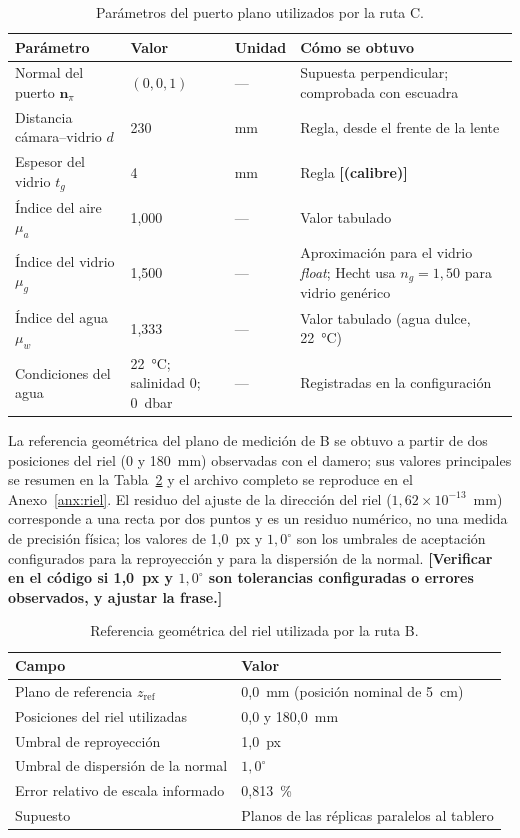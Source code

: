 \documentclass{report}
\newcommand{\pend}[1]{\textbf{[#1]}}
\newcommand{\si}[1]{#1}
\newcommand{\celsius}{°C}
\begin{document}
\begin{table}[htbp]

\caption{Parámetros del puerto plano utilizados por la ruta C.}
\label{tab:puerto}
\begin{tabular}{@{}p{3.6cm}p{2.6cm}p{1.2cm}p{5.4cm}@{}}
\hline
Parámetro & Valor & Unidad & Cómo se obtuvo \\
\hline
Normal del puerto $\mathbf{n}_\pi$ & $(0, 0, 1)$ & --- & Supuesta perpendicular; comprobada con escuadra \\
Distancia cámara--vidrio $d$ & 230 & mm & Regla, desde el frente de la lente \\
Espesor del vidrio $t_g$ & 4 & mm & Regla \pend{(calibre)} \\
Índice del aire $\mu_a$ & 1,000 & --- & Valor tabulado \\
Índice del vidrio $\mu_g$ & 1,500 & --- & Aproximación para el vidrio \emph{float}; Hecht usa $n_g = 1{,}50$ para vidrio genérico \parencite[pp.~111, 132]{Hecht2017} \\
Índice del agua $\mu_w$ & 1,333 & --- & Valor tabulado (agua dulce, 22~\si{\celsius}) \\
Condiciones del agua & 22~\si{\celsius}; salinidad 0; 0~dbar & --- & Registradas en la configuración \\
\hline
\end{tabular}
\end{table}

La referencia geométrica del plano de medición de B se obtuvo a partir de dos posiciones del riel (0 y 180~mm) observadas con el damero; sus valores principales se resumen en la Tabla~\ref{tab:riel} y el archivo completo se reproduce en el Anexo~\ref{anx:riel}. El residuo del ajuste de la dirección del riel ($1{,}62 \times 10^{-13}$~mm) corresponde a una recta por dos puntos y es un residuo numérico, no una medida de precisión física; los valores de 1,0~px y $1{,}0^{\circ}$ son los umbrales de aceptación configurados para la reproyección y para la dispersión de la normal. \pend{Verificar en el código si 1,0~px y $1{,}0^{\circ}$ son tolerancias configuradas o errores observados, y ajustar la frase.}

\begin{table}[htbp]

\caption{Referencia geométrica del riel utilizada por la ruta B.}
\label{tab:riel}
\begin{tabular}{@{}p{6cm}p{7cm}@{}}
\hline
Campo & Valor \\
\hline
Plano de referencia $z_{\mathrm{ref}}$ & 0,0~mm (posición nominal de 5~cm) \\
Posiciones del riel utilizadas & 0,0 y 180,0~mm \\
Umbral de reproyección & 1,0~px \\
Umbral de dispersión de la normal & $1{,}0^{\circ}$ \\
Error relativo de escala informado & 0,813~\% \\
Supuesto & Planos de las réplicas paralelos al tablero \\
\hline
\end{tabular}
\end{table}
\end{document}
